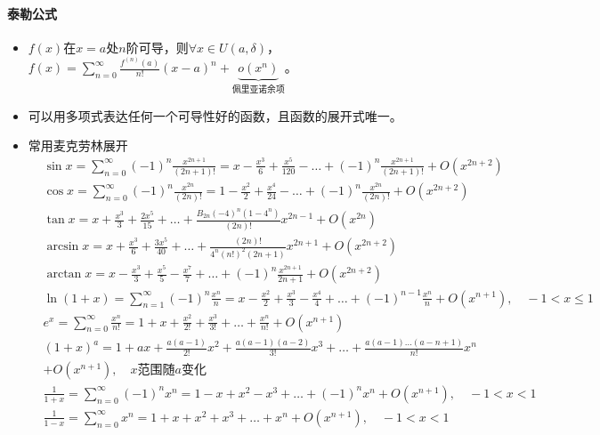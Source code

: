 \documentclass[
12pt, %
a4paper, 
oneside, %
]{scrartcl}
\begin{document}
\paragraph{泰勒公式}
\begin{itemize}
\item $ f(x) $在$ x = a $处$ n $阶可导，则$ \forall x \in U(a, \delta) $，$ f(x) = \sum_{n = 0}^{\infty} \frac{f^{(n)}(a)}{n!}(x - a)^n + \underbrace{o(x^n)}_{\text{佩里亚诺余项}} $。
\item 可以用多项式表达任何一个可导性好的函数，且函数的展开式唯一。
\item 常用麦克劳林展开\label{sec:taylor}
\begin{align*}
&\sin x = \sum_{n = 0}^{\infty} (-1)^n \frac{x^{2n + 1}}{(2n + 1)!} = x - \frac{x^3}{6} + \frac{x^5}{120} - \dots + (-1)^n \frac{x^{2n + 1}}{(2n + 1)!} + O(x^{2n + 2}) \\
&\cos x = \sum_{n = 0}^{\infty} (-1)^n \frac{x^{2n}}{(2n)!} = 1 - \frac{x^2}{2} + \frac{x^4}{24} - \dots + (-1)^n \frac{x^{2n}}{(2n)!} + O(x^{2n + 2}) \\
&\tan x = x + \frac{x^3}{3} + \frac{2x^5}{15} + \dots + \frac{B_{2n} (-4)^n (1 - 4^n)}{(2n)!} x^{2n - 1} + O(x^{2n}) \\
&\arcsin x = x + \frac{x^3}{6} + \frac{3x^5}{40} + \dots + \frac{(2n)!}{4^n (n!)^2 (2n + 1)} x^{2n + 1} + O(x^{2n + 2}) \\
&\arctan x = x - \frac{x^3}{3} + \frac{x^5}{5} - \frac{x^7}{7} + \dots + (-1)^n \frac{x^{2n + 1}}{2n + 1} + O(x^{2n + 2}) \\
&\ln(1 + x) = \sum_{n = 1}^{\infty} (-1)^n \frac{x^n}{n} = x - \frac{x^2}{2} + \frac{x^3}{3} - \frac{x^4}{4} + \dots + (-1)^{n - 1} \frac{x^n}{n} + O(x^{n + 1}), \quad -1 < x \leq 1 \\
&e^x = \sum_{n = 0}^{\infty} \frac{x^n}{n!} = 1 + x + \frac{x^2}{2!} + \frac{x^3}{3!} + \dots + \frac{x^n}{n!} + O(x^{n + 1}) \\
&(1 + x)^a = 1 + ax + \frac{a(a - 1)}{2!}x^2 + \frac{a(a - 1)(a - 2)}{3!}x^3 + \dots + \frac{a(a - 1)\dots(a - n + 1)}{n!}x^n \\
&+ O(x^{n + 1}), \quad x \text{范围随} a \text{变化} \\
&\frac{1}{1 + x} = \sum_{n = 0}^{\infty} (-1)^n x^n = 1 - x + x^2 - x^3 + \dots + (-1)^n x^n + O(x^{n + 1}), \quad -1 < x < 1 \\
&\frac{1}{1 - x} = \sum_{n = 0}^{\infty} x^n = 1 + x + x^2 + x^3 + \dots + x^n + O(x^{n + 1}), \quad -1 < x < 1
\end{align*}
\end{itemize}
\end{document}
